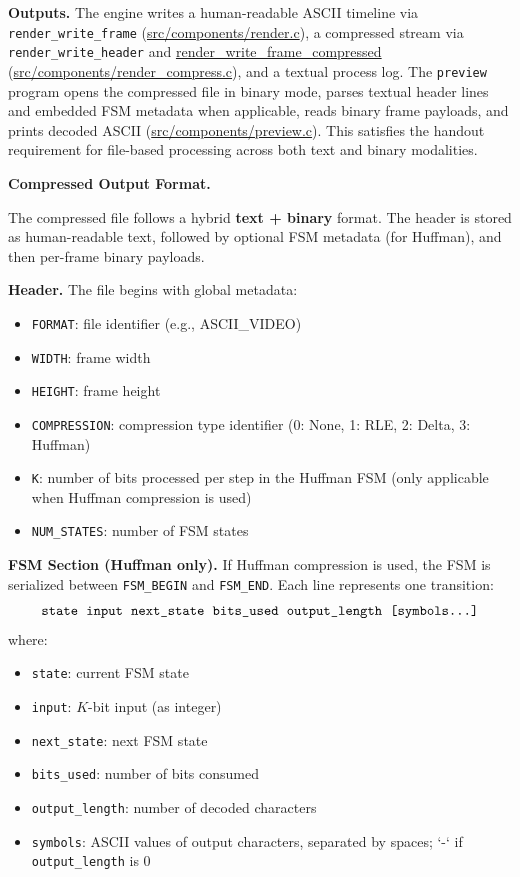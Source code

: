 \vspace{0.3em}
\noindent \textbf{Outputs.} The engine writes a human-readable ASCII timeline via \texttt{render\_write\_frame} (\url{src/components/render.c}), a compressed stream via \texttt{render\_write\_header} and \url{render_write_frame_compressed} (\url{src/components/render_compress.c}), and a textual process log. The \texttt{preview} program opens the compressed file in binary mode, parses textual header lines and embedded FSM metadata when applicable, reads binary frame payloads, and prints decoded ASCII (\url{src/components/preview.c}).
This satisfies the handout requirement for file-based processing across both text and binary modalities.

\vspace{0.5em}
\noindent \textbf{Compressed Output Format.}  

\noindent The compressed file follows a hybrid \textbf{text + binary} format. The header is stored as human-readable text, followed by optional FSM metadata (for Huffman), and then per-frame binary payloads.

\vspace{0.3em}
\noindent \textbf{Header.}  
The file begins with global metadata:
\begin{itemize}
    \item \texttt{FORMAT}: file identifier (e.g., ASCII\_VIDEO)
    \item \texttt{WIDTH}: frame width 
    \item \texttt{HEIGHT}: frame height
    \item \texttt{COMPRESSION}: compression type identifier (0: None, 1: RLE, 2: Delta, 3: Huffman)
    \item \texttt{K}: number of bits processed per step in the Huffman FSM (only applicable when Huffman compression is used)
    \item \texttt{NUM\_STATES}: number of FSM states
\end{itemize}

\vspace{0.3em}
\noindent \textbf{FSM Section (Huffman only).}  
If Huffman compression is used, the FSM is serialized between \texttt{FSM\_BEGIN} and \texttt{FSM\_END}. Each line represents one transition:
\[
\texttt{state\;\;input\;\;next\_state\;\;bits\_used\;\;output\_length\;\;[symbols...]}
\]
where:
\begin{itemize}
    \item \texttt{state}: current FSM state
    \item \texttt{input}: $K$-bit input (as integer)
    \item \texttt{next\_state}: next FSM state
    \item \texttt{bits\_used}: number of bits consumed
    \item \texttt{output\_length}: number of decoded characters
    \item \texttt{symbols}: ASCII values of output characters, separated by spaces; `-` if \texttt{output\_length} is 0
\end{itemize}

